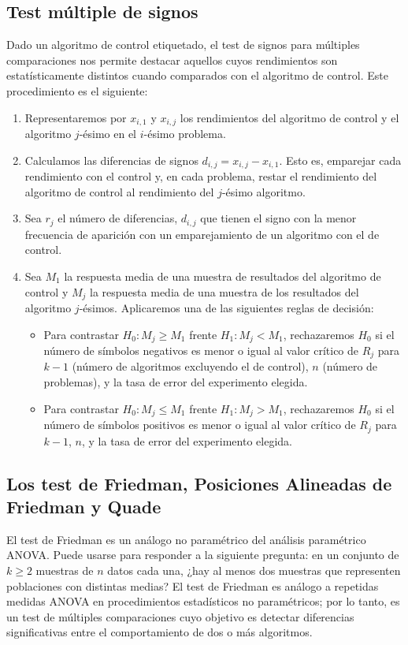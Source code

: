 \subsection{Test múltiple de signos}

Dado un algoritmo de control etiquetado, el test de signos para múltiples comparaciones nos permite destacar aquellos cuyos rendimientos son estatísticamente distintos cuando comparados con el algoritmo de control. 
Este procedimiento es el siguiente:
\begin{enumerate}
	\item Representaremos por $x_{i,1}$ y $x_{i,j}$ los rendimientos del algoritmo de control y el algoritmo $j$-ésimo en el $i$-ésimo problema.
	\item Calculamos las diferencias de signos $d_{i,j} = x_{i,j} - x_{i,1}$. 
Esto es, emparejar cada rendimiento con el control y, en cada problema, restar el rendimiento del algoritmo de control al rendimiento del $j$-ésimo algoritmo. 
	\item Sea $r_j$ el número de diferencias, $d_{i,j}$ que tienen el signo con la menor frecuencia de aparición con un emparejamiento de un algoritmo con el de control. 
	\item Sea $M_1$ la respuesta media de una muestra de resultados del algoritmo de control y $M_j$ la respuesta media de una muestra de los resultados del algoritmo $j$-ésimos. 
Aplicaremos una de las siguientes reglas de decisión:
	\begin{itemize}
		\item Para contrastar $H_0 : M_j \geq M_1$ frente $H_1:M_j < M_1$, rechazaremos $H_0$ si el número de símbolos negativos es menor o igual al valor crítico de $R_j$ para $k-1$ (número de algoritmos excluyendo el de control), $n$ (número de problemas), y la tasa de error del experimento elegida. 
		\item Para contrastar $H_0 : M_j \leq M_1$ frente $H_1:M_j > M_1$, rechazaremos $H_0$ si el número de símbolos positivos es menor o igual al valor crítico de $R_j$ para $k-1$, $n$, y la tasa de error del experimento elegida.  
	\end{itemize}
\end{enumerate}

\subsection{Los test de Friedman, Posiciones Alineadas de Friedman y Quade}

El test de Friedman es un análogo no paramétrico del análisis paramétrico ANOVA. 
Puede usarse para responder a la siguiente pregunta: 
en un conjunto de $k\geq 2$ muestras de $n$ datos cada una, ¿hay al menos dos muestras que representen poblaciones con distintas medias? 
El test de Friedman es análogo a repetidas medidas ANOVA en procedimientos estadísticos no paramétricos; por lo tanto, es un test de múltiples comparaciones cuyo objetivo es detectar diferencias significativas entre el comportamiento de dos o más algoritmos. 

